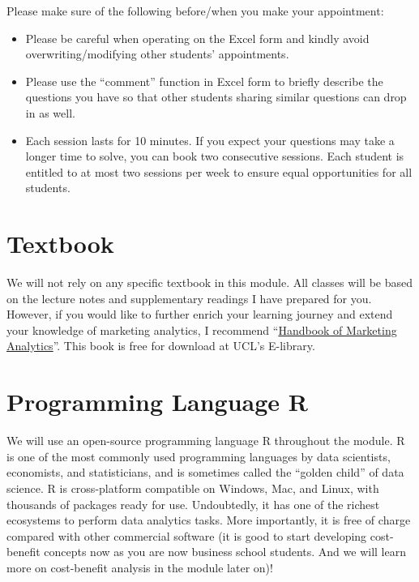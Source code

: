 \documentclass[
  11pt,
]{book}
\providecommand{\tightlist}{%
  \setlength{\itemsep}{0pt}\setlength{\parskip}{0pt}}
\begin{document}
Please make sure of the following before/when you make your appointment:

\begin{itemize}
\tightlist
\item
  Please be careful when operating on the Excel form and kindly avoid overwriting/modifying other students' appointments.
\item
  Please use the ``comment'' function in Excel form to briefly describe the questions you have so that other students sharing similar questions can drop in as well.
\item
  Each session lasts for 10 minutes. If you expect your questions may take a longer time to solve, you can book two consecutive sessions. Each student is entitled to at most two sessions per week to ensure equal opportunities for all students.
\end{itemize}

\hypertarget{textbook}{%
\section{Textbook}\label{textbook}}

We will not rely on any specific textbook in this module. All classes will be based on the lecture notes and supplementary readings I have prepared for you. However, if you would like to further enrich your learning journey and extend your knowledge of marketing analytics, I recommend ``\href{https://ucl-new-primo.hosted.exlibrisgroup.com/permalink/f/5qfvbu/UCL_LMS_DS51237610180004761}{Handbook of Marketing Analytics}''. This book is free for download at UCL's E-library.

\hypertarget{programming-language-r}{%
\section{Programming Language R}\label{programming-language-r}}

We will use an open-source programming language R throughout the module. R is one of the most commonly used programming languages by data scientists, economists, and statisticians, and is sometimes called the ``golden child'' of data science. R is cross-platform compatible on Windows, Mac, and Linux, with thousands of packages ready for use. Undoubtedly, it has one of the richest ecosystems to perform data analytics tasks. More importantly, it is free of charge compared with other commercial software (it is good to start developing cost-benefit concepts now as you are now business school students. And we will learn more on cost-benefit analysis in the module later on)!
\end{document}
